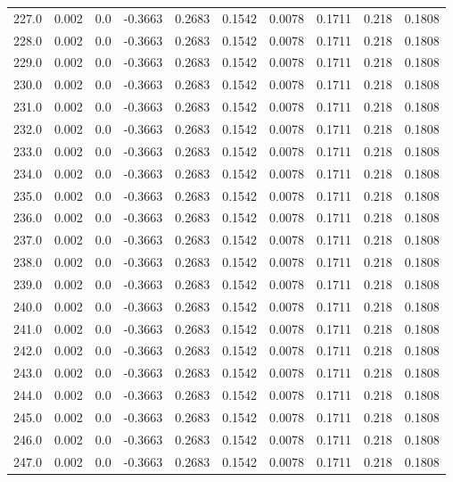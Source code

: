 \begin{longtable}{lrrrrrrrrr}
227.0 & 0.002 & 0.0 & -0.3663 & 0.2683 & 0.1542 & 0.0078 & 0.1711 & 0.218 & 0.1808 \\
228.0 & 0.002 & 0.0 & -0.3663 & 0.2683 & 0.1542 & 0.0078 & 0.1711 & 0.218 & 0.1808 \\
229.0 & 0.002 & 0.0 & -0.3663 & 0.2683 & 0.1542 & 0.0078 & 0.1711 & 0.218 & 0.1808 \\
230.0 & 0.002 & 0.0 & -0.3663 & 0.2683 & 0.1542 & 0.0078 & 0.1711 & 0.218 & 0.1808 \\
231.0 & 0.002 & 0.0 & -0.3663 & 0.2683 & 0.1542 & 0.0078 & 0.1711 & 0.218 & 0.1808 \\
232.0 & 0.002 & 0.0 & -0.3663 & 0.2683 & 0.1542 & 0.0078 & 0.1711 & 0.218 & 0.1808 \\
233.0 & 0.002 & 0.0 & -0.3663 & 0.2683 & 0.1542 & 0.0078 & 0.1711 & 0.218 & 0.1808 \\
234.0 & 0.002 & 0.0 & -0.3663 & 0.2683 & 0.1542 & 0.0078 & 0.1711 & 0.218 & 0.1808 \\
235.0 & 0.002 & 0.0 & -0.3663 & 0.2683 & 0.1542 & 0.0078 & 0.1711 & 0.218 & 0.1808 \\
236.0 & 0.002 & 0.0 & -0.3663 & 0.2683 & 0.1542 & 0.0078 & 0.1711 & 0.218 & 0.1808 \\
237.0 & 0.002 & 0.0 & -0.3663 & 0.2683 & 0.1542 & 0.0078 & 0.1711 & 0.218 & 0.1808 \\
238.0 & 0.002 & 0.0 & -0.3663 & 0.2683 & 0.1542 & 0.0078 & 0.1711 & 0.218 & 0.1808 \\
239.0 & 0.002 & 0.0 & -0.3663 & 0.2683 & 0.1542 & 0.0078 & 0.1711 & 0.218 & 0.1808 \\
240.0 & 0.002 & 0.0 & -0.3663 & 0.2683 & 0.1542 & 0.0078 & 0.1711 & 0.218 & 0.1808 \\
241.0 & 0.002 & 0.0 & -0.3663 & 0.2683 & 0.1542 & 0.0078 & 0.1711 & 0.218 & 0.1808 \\
242.0 & 0.002 & 0.0 & -0.3663 & 0.2683 & 0.1542 & 0.0078 & 0.1711 & 0.218 & 0.1808 \\
243.0 & 0.002 & 0.0 & -0.3663 & 0.2683 & 0.1542 & 0.0078 & 0.1711 & 0.218 & 0.1808 \\
244.0 & 0.002 & 0.0 & -0.3663 & 0.2683 & 0.1542 & 0.0078 & 0.1711 & 0.218 & 0.1808 \\
245.0 & 0.002 & 0.0 & -0.3663 & 0.2683 & 0.1542 & 0.0078 & 0.1711 & 0.218 & 0.1808 \\
246.0 & 0.002 & 0.0 & -0.3663 & 0.2683 & 0.1542 & 0.0078 & 0.1711 & 0.218 & 0.1808 \\
247.0 & 0.002 & 0.0 & -0.3663 & 0.2683 & 0.1542 & 0.0078 & 0.1711 & 0.218 & 0.1808 \\

\end{longtable}
